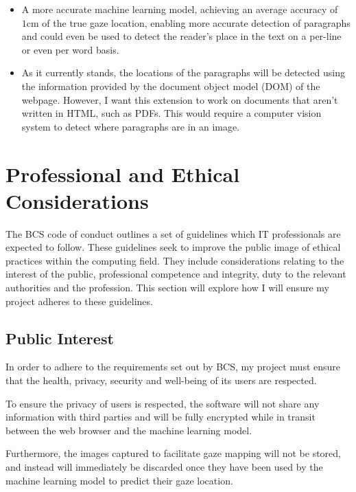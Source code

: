 \documentclass{report}
\begin{document}
\begin{itemize}
    \item A more accurate machine learning model, achieving an average accuracy of \(1\text{cm}\) of the true gaze location, enabling more accurate detection of paragraphs and could even be used to detect the reader's place in the text on a per-line or even per word basis.

    \item As it currently stands, the locations of the paragraphs will be detected using the information provided by the document object model (DOM) of the webpage. However, I want this extension to work on documents that aren't written in HTML, such as PDFs. This would require a computer vision system to detect where paragraphs are in an image.
\end{itemize}

\chapter{Professional and Ethical Considerations}
\label{chap:ethics}

\noindent
The BCS code of conduct \cite{bcs2022coc} outlines a set of guidelines which IT professionals are expected to follow. These guidelines seek to improve the public image of ethical practices within the computing field. They include considerations relating to the interest of the public, professional competence and integrity, duty to the relevant authorities and the profession. This section will explore how I will ensure my project adheres to these guidelines. 

\section{Public Interest}   

In order to adhere to the requirements set out by BCS, my project must ensure that the health, privacy, security and well-being of its users are respected. 

To ensure the privacy of users is respected, the software will not share any information with third parties and will be fully encrypted while in transit between the web browser and the machine learning model. 

Furthermore, the images captured to facilitate gaze mapping will not be stored, and instead will immediately be discarded once they have been used by the machine learning model to predict their gaze location.
\end{document}
